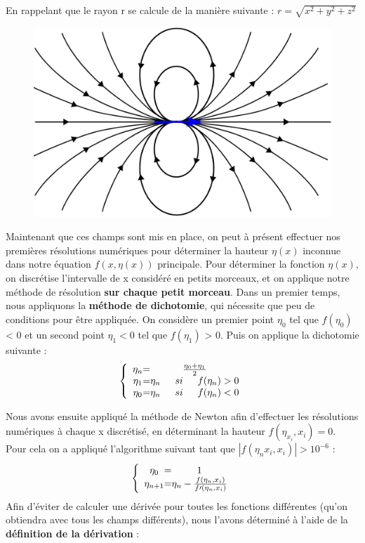\documentclass{article}
\begin{document}
En rappelant que le rayon r se calcule de la manière suivante : $r = \sqrt{x^2 + y^2 +z^2}$
\begin{figure}[h]
	\centering
    \includegraphics[width=.5\linewidth]{Dipole.png}
    
\end{figure}

Maintenant que ces champs sont mis en place, on peut à présent effectuer nos premières résolutions numériques pour déterminer la hauteur $\eta(x)$ inconnue dans notre équation $f(x,\eta(x))$ principale. Pour déterminer la fonction $\eta(x)$, on discrétise l'intervalle de x considéré en petits morceaux, et on applique notre méthode de résolution \textbf{sur chaque petit morceau}. 
\newline
Dans un premier temps, nous appliquons la \textbf{méthode de dichotomie}, qui nécessite que peu de conditions pour être appliquée. On considère un premier point $\eta_{0}$ tel que $f(\eta_{0})$ < 0 et un second point $\eta_{1} < 0$ tel que $f(\eta_{1})$ > 0. Puis on applique la dichotomie suivante : \newline 
\[
\left \{
\begin{array}{c @{=} c}
    \eta_{n} & \frac{\eta_{0} + \eta_{1}}{2} \\
    \eta_{1} & \eta_{n} \indent si \indent f(\eta_{n})  > 0 \\
    \eta_{0} & \eta_{n} \indent si \indent f(\eta_{n}) < 0
\end{array}
\right.
\]

Nous avons ensuite appliqué la méthode de Newton afin d'effectuer les résolutions numériques à chaque x discrétisé, en déterminant la hauteur $f(\eta_{x_{i}},x_{i}) = 0$. Pour cela on a appliqué l'algorithme suivant tant que $|f(\eta_n{{x_{i}}},x_{i})| > 10^{-6}$ :
\newline 
\[
\left \{
\begin{array}{c @{=} c}
    \eta_{0} & 1  \\
    \eta_{n+1} & \eta_{n} - \frac{f(\eta_{n},x_{i})}{f\prime(\eta_{n},x_{i})}
\end{array}
\right.
\]
Afin d'éviter de calculer une dérivée pour toutes les fonctions différentes (qu'on obtiendra avec tous les champs différents), nous l'avons déterminé à l'aide de la \textbf{définition de la dérivation} :
\end{document}
